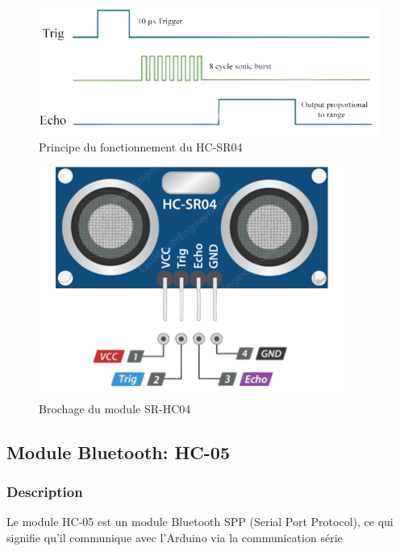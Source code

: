 \begin{figure}[hbt!]
    \centering
    \includegraphics[width=14cm]{assets/HC-SR04/principe.png}
    \caption{Principe du fonctionnement du HC-SR04}
\end{figure}

\begin{figure}[!htbp]
    \centering
    \includegraphics[width=10cm]{assets/HC-SR04/pinout.png}
    \caption{Brochage du module SR-HC04}
\end{figure}

\FloatBarrier

\subsection{Module Bluetooth: HC-05}

\subsubsection{Description}
Le module HC-05 est un module Bluetooth SPP (Serial Port Protocol), ce qui signifie qu’il communique avec l’Arduino via la communication série

